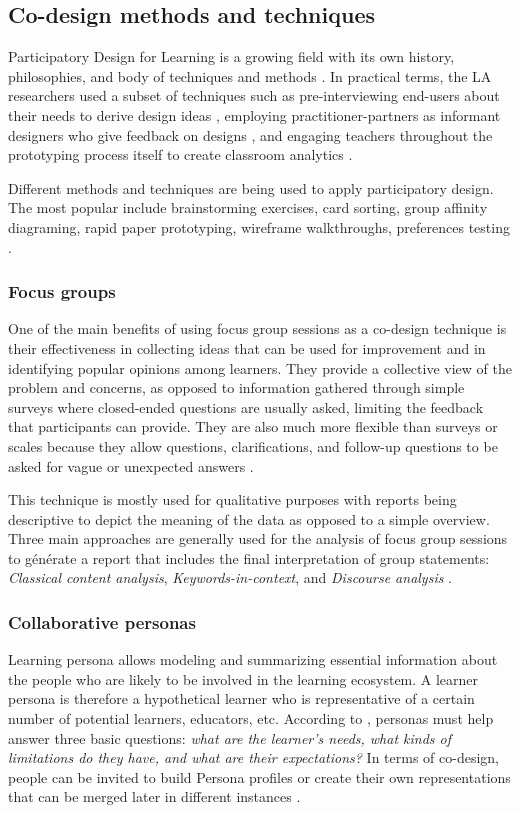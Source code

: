 \documentclass[preprint,12pt]{elsarticle}
\begin{document}
\subsection{Co-design methods and techniques}
Participatory Design for Learning is a growing field with its own history, philosophies, and body of techniques and methods \cite{disalvo2017participatory}. In practical terms, the LA researchers used a subset of techniques such as pre-interviewing end-users about 
their needs to derive design ideas \cite{xhakaj2016teachers}, employing practitioner-partners as informant designers who give feedback on 
designs \cite{fiorini2018application}, and engaging teachers throughout the prototyping process itself to create classroom analytics \cite{holstein2018classroom}.

Different methods and techniques are being used to apply participatory design. The most popular include brainstorming exercises, card sorting, group affinity diagraming, rapid paper prototyping, wireframe walkthroughs, preferences testing \cite{abel2013cross}. 

\subsubsection{Focus groups}
One of the main benefits of using focus group sessions as a co-design technique is their effectiveness in collecting ideas that can be used for improvement and in identifying popular opinions among learners.  They provide a collective view of the problem and concerns, as opposed to information gathered through simple surveys where closed-ended questions are usually asked, limiting the feedback that participants can provide. They are also much more flexible than surveys or scales because they allow questions, clarifications, and follow-up questions to be asked for vague or unexpected answers \cite{krueger2014focus}. 

This technique is mostly used for qualitative purposes with reports being descriptive to depict the meaning of the data as opposed to a simple overview. Three main approaches are generally used for the analysis of focus group sessions to générate a report that includes the final interpretation of group
statements: \textit{Classical content analysis}, \textit{Keywords-in-context}, and \textit{Discourse analysis} \cite{prieto2018co}.



\subsubsection{Collaborative personas}
Learning persona allows modeling and summarizing essential information about the people who are likely to be involved in the learning ecosystem. A learner persona is therefore a hypothetical learner who is representative of a certain number of potential learners, educators, etc.
According to \citet{zhang2016data}, personas must help answer three basic questions: \textit{what are the learner’s needs, what kinds of limitations do they have, and what are their expectations?}
In terms of co-design, people can be invited to build Persona profiles or create their own representations that can be merged later in different instances \cite{prieto2018co}.
\end{document}
